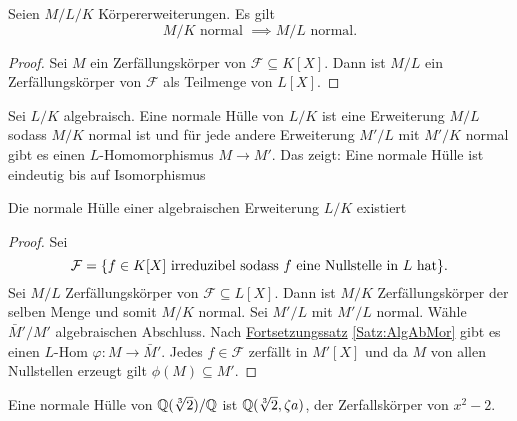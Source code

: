 \begin{Lemma}
    Seien $M/L/K$ Körpererweiterungen. Es gilt $$M/K \text{ normal }\implies M/L \text{ normal.}$$
\end{Lemma}
\begin{proof}
    Sei $M$ ein Zerfällungskörper von $\mathcal{F}\subseteq K[X]$. Dann ist $M/L$ ein Zerfällungskörper von $\mathcal F$ als Teilmenge von $L[X].$
\end{proof}
\begin{Def}
    Sei $L/K$ algebraisch. Eine normale Hülle von $L/K$ ist eine Erweiterung $M/L$ sodass $M/K$ normal ist und für jede andere Erweiterung $M'/L$ mit $M'/K$ normal gibt es einen $L$-Homomorphismus $M\to M'$. Das zeigt: Eine normale Hülle ist eindeutig bis auf Isomorphismus
\end{Def}
\begin{Satz}
    Die normale Hülle einer algebraischen Erweiterung $L/K$ existiert
\end{Satz}
\begin{proof}
    Sei $$\mathcal F=\{f\in K[X] \text{ irreduzibel sodass $f$ eine Nullstelle in $L$ hat}\}.$$ Sei $M/L$ Zerfällungskörper von $\mathcal F\subseteq L[X]$. Dann ist $M/K$ Zerfällungskörper der selben Menge und somit $M/K$ normal. Sei $M'/L$ mit $M'/L$ normal. Wähle $\bar M'/M'$ algebraischen Abschluss. Nach \hyperref[Satz:AlgAbMor]{Fortsetzungssatz} \ref{Satz:AlgAbMor} gibt es einen $L$-Hom $\varphi\colon M\to\bar M'$. Jedes $f\in\mathcal F$ zerfällt in $M'[X]$ und da $M$ von allen Nullstellen erzeugt gilt $\phi(M)\subseteq M'$.
\end{proof}
\begin{Bsp}
    Eine normale Hülle von $\mathbb{Q}(\sqrt[3]{2})/\mathbb{Q}$ ist $\mathbb{Q}(\sqrt[3]{2},\zeta a)$, der Zerfallskörper von $x^2-2.$
\end{Bsp}

